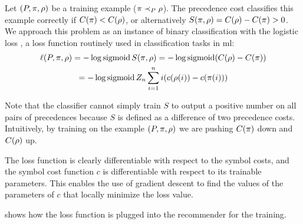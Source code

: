 Let $(P, \pi, \rho)$ be a training example ($\pi \prec_{P} \rho$).
The precedence cost classifies this example correctly if $C(\pi) < C(\rho)$,
or alternatively $S(\pi, \rho) = C(\rho) - C(\pi) > 0$.
We approach this problem as an instance of binary classification with the logistic loss \cite{Mohri2018},
a loss function routinely used in classification tasks in \acrlong{ml}:
\begin{multline*}
\ell(P, \pi, \rho)
= - \log \operatorname{sigmoid} S(\pi, \rho)
= - \log \operatorname{sigmoid} (C(\rho) - C(\pi)) \\
= - \log \operatorname{sigmoid} Z_n \sum_{i=1}^n i (c(\rho(i)) - c(\pi(i)))
\end{multline*}

Note that the classifier cannot simply train $S$ to output a positive number on all pairs of precedences
because $S$ is defined as a difference of two precedence costs.
Intuitively, by training on the example $(P, \pi, \rho)$
we are pushing $C(\pi)$ down and $C(\rho)$ up.

The loss function is clearly differentiable with respect to the symbol costs,
and the symbol cost function $c$ is differentiable with respect to its trainable parameters.
This enables the use of gradient descent to find the values of the parameters of $c$
that locally minimize the loss value.

 shows how the loss function is plugged into the recommender for the training.
